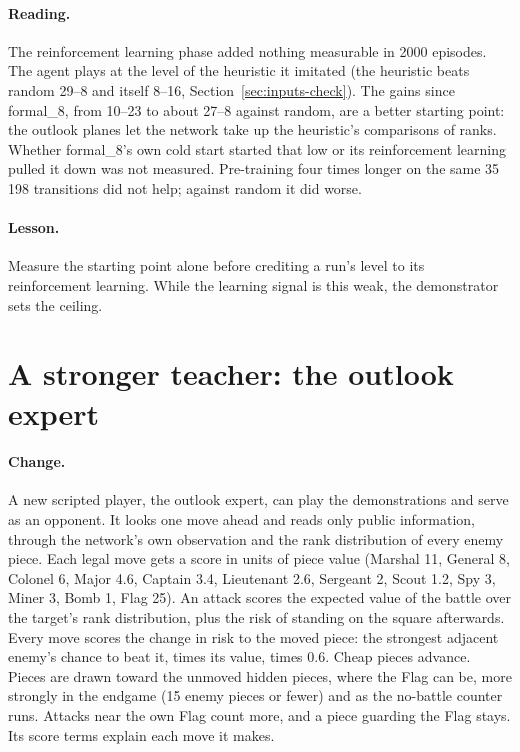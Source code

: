 \paragraph{Reading.} The reinforcement learning phase added nothing measurable in 2000 episodes.
The agent plays at the level of the heuristic it imitated (the heuristic beats random 29--8 and
itself 8--16, Section~\ref{sec:inputs-check}). The gains since formal\_8, from 10--23 to about 27--8
against random, are a better starting point: the outlook planes let the network take up the
heuristic's comparisons of ranks. Whether formal\_8's own cold start started that low or its
reinforcement learning pulled it down was not measured. Pre-training four times longer on the same
35\,198 transitions did not help; against random it did worse.

\paragraph{Lesson.} Measure the starting point alone before crediting a run's level to its
reinforcement learning. While the learning signal is this weak, the demonstrator sets the ceiling.

\section{A stronger teacher: the outlook expert}
\label{sec:expert}

\paragraph{Change.} A new scripted player, the outlook expert, can play the demonstrations and
serve as an opponent. It looks one move ahead and reads only public information, through the
network's own observation and the rank distribution of every enemy piece. Each legal move gets a
score in units of piece value (Marshal 11, General 8, Colonel 6, Major 4.6, Captain 3.4, Lieutenant
2.6, Sergeant 2, Scout 1.2, Spy 3, Miner 3, Bomb 1, Flag 25). An attack scores the expected value of
the battle over the target's rank distribution, plus the risk of standing on the square afterwards.
Every move scores the change in risk to the moved piece: the strongest adjacent enemy's chance to
beat it, times its value, times 0.6. Cheap pieces advance. Pieces are drawn toward the unmoved
hidden pieces, where the Flag can be, more strongly in the endgame (15 enemy pieces or fewer) and as
the no-battle counter runs. Attacks near the own Flag count more, and a piece guarding the Flag
stays. Its score terms explain each move it makes.

